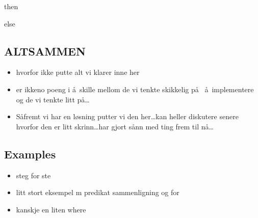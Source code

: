 then

else

\subsection{ALTSAMMEN}
\begin{itemize}
  \item hvorfor ikke putte alt vi klarer inne her
  \item er ikkeno poeng i \aa~skille mellom de vi tenkte skikkelig p\aa~ \aa~implementere og de vi tenkte litt
  p\aa\ldots
  \item S\aa fremt vi har en l\o sning putter vi den her\ldots kan heller diskutere senere hvorfor den er litt
  skrinn\ldots har gjort s\aa nn med ting frem til n\aa\ldots
\end{itemize}

\subsection{Examples}
\label{sect:translation:markxremoveExamples}
\begin{itemize}
\item steg for ste
\item litt stort eksempel m predikat sammenligning og for
\item kanskje en liten where
\end{itemize}
